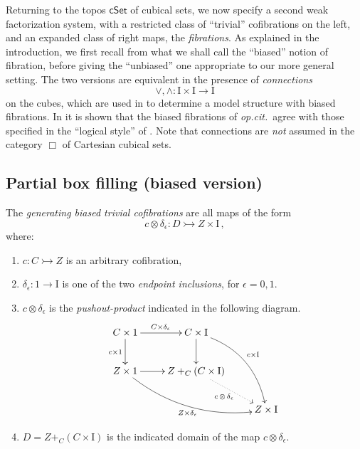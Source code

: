 \documentclass[11pt,reqno]{amsart}
\newcommand{\opcit}{\emph{op.cit.}}
\newcommand{\cSet}{\ensuremath{\mathsf{cSet}}}
\newcommand{\mono}{\ensuremath{\rightarrowtail}}
\newcommand{\ra}{\ensuremath{\rightarrow}}
\newcommand{\too}{\ensuremath{\longrightarrow}}
\newcommand{\I}{\ensuremath{\mathrm{I}}}
\theoremstyle{remark}
\theoremstyle{definition}
\begin{document}
Returning to the topos $\cSet$ of cubical sets, we now specify a second weak factorization system, with a restricted class of ``trivial'' cofibrations on the left, and an expanded class of right maps, the \emph{fibrations}.  As explained in the introduction, we first recall from \cite{GS} what we shall call the ``biased'' notion of fibration, before giving the ``unbiased'' one appropriate to our more general setting.   The two versions are equivalent in the presence of \emph{connections} 
\[
\vee,\wedge : \I\times\I \too \I
\]
 on the cubes, which are used in \cite{Sattler:2017ee} to determine a model structure with biased fibrations.  In \cite{AGH} it is shown that the biased fibrations of \opcit\ agree with those specified in the ``logical style'' of \cite{CCHM:2018ctt,orton-pitts}.    Note that connections are \emph{not} assumed in the category $\Box$ of Cartesian cubical sets.

\subsection*{Partial box filling (biased version)}\label{sec:biasedfibration}

The \emph{generating biased trivial cofibrations} are all maps of the form
\begin{equation}\label{eq:genclassTCof}
c \otimes \delta_\epsilon : D \mono Z\times \I\,,
\end{equation}
where:
\begin{enumerate}
\item  $c : C \mono Z$ is an arbitrary cofibration,

\item $\delta_\epsilon : 1 \ra \I$ is one of the two \emph{endpoint inclusions}, for $\epsilon = 0,1$.

\item $c\otimes\delta_\epsilon$ is the \emph{pushout-product} indicated in the following diagram.
\begin{equation}\label{diagram:pushoutproduct}
\xymatrix{
C\times 1 \ar[d]_{c\times 1} \ar[r]^{C\times \delta_\epsilon} & C\times \I \ar[d] \ar@/^4ex/ [rdd]^{c\times \I}\\
Z\times 1 \ar@/_4ex/ [rrd]_{Z\times \delta_\epsilon} \ar[r] &  Z +_C (C\times\I) \ar@{..>}[rd]_{c\, \otimes\, \delta_\epsilon} \\
&& Z\times\I
}
\end{equation}

\item $D = Z +_C (C\times\I)$ is the indicated domain of the map $c \otimes \delta_\epsilon$.
\end{enumerate}
\end{document}
